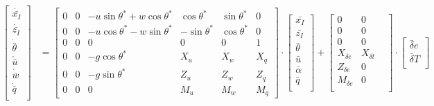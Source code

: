 \documentclass{article}
\begin{document}
\begin{align*}
\begin{bmatrix}
\dot{\bar{x_I}} \\
\dot{\bar{z_I}} \\
\dot{\bar{\theta}} \\
\dot{\bar{u}} \\
\dot{\bar{w}} \\
\dot{\bar{q}} \\
\end{bmatrix} &= 
\begin{bmatrix}
0 & 0 & -u \sin \theta^* + w \cos \theta^* & \cos \theta^* & \sin \theta^* & 0 \\
0 & 0 & -u \cos \theta^* - w \sin \theta^* & -\sin \theta^* & \cos \theta^* & 0 \\
0 & 0 & 0 & 0 & 0 & 1 \\
0 & 0 & -g\cos\theta^* & X_u & X_w & X_q \\
0 & 0 & -g\sin\theta^* & Z_u & Z_w & Z_q \\
0 & 0 & 0 & M_u & M_w & M_q 
\end{bmatrix}
\cdot
\begin{bmatrix}
\bar{x_I} \\
\bar{z_I} \\
\bar{\theta} \\
\bar{u} \\
\bar{\alpha} \\
\bar{q} \\
\end{bmatrix} 
+
\begin{bmatrix}
0 & 0 & \\
0 & 0 & \\
0 & 0 & \\
X_{\delta e} & X_{\delta t} \\
Z_{\delta e} & 0 \\
M_{\delta e} & 0 \\
\end{bmatrix} \cdot
\begin{bmatrix}
\bar{\delta} e\\
\bar{\delta} T\\
\end{bmatrix}
\end{align*}
\fi
\end{document}
